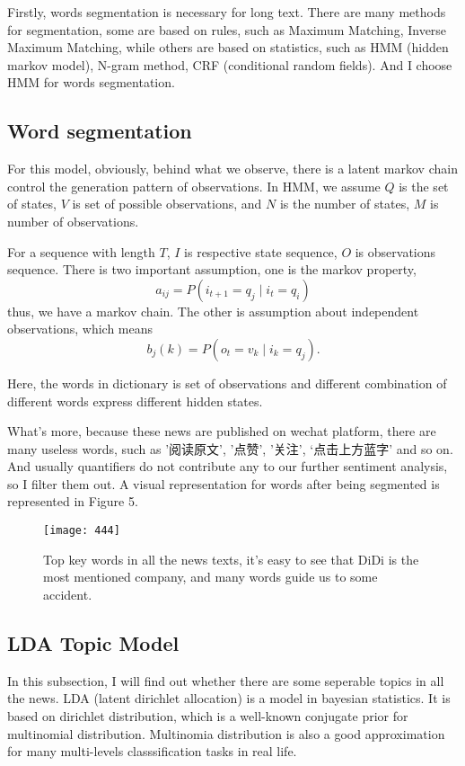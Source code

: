 \documentclass[12pt]{extarticle}
\begin{document}
Firstly, words segmentation is necessary for long text. There are many methods for segmentation, some are based on rules, such as Maximum Matching, Inverse Maximum Matching, while others are based on statistics, such as HMM (hidden markov model), N-gram method, CRF (conditional random fields). And I choose HMM for words segmentation.
\subsection{Word segmentation}
For this model, obviously, behind what we observe, there is a latent markov chain control the generation pattern of observations. In HMM, we assume $Q$ is the set of states, $V$ is set of possible observations, and $N$ is the number of states, $M$ is number of observations.

For a sequence with length $T$, $I$ is respective state sequence, $O$ is observations sequence. There is two important assumption, one is the markov property,
$$a_{ij} = P(i_{t+1} = q_j \mid i_t = q _i)$$
thus, we have a markov chain. The other is assumption about independent observations, which means 
$$b_j(k) = P(o_t = v_k \mid i_k = q_j).$$

Here, the words in dictionary is set of observations and different combination of different words express different hidden states.

What's more, because these news are published on wechat platform, there are many useless words, such as '阅读原文', '点赞', '关注', ‘点击上方蓝字' and so on. And usually quantifiers do not contribute any to our further sentiment analysis, so I filter them out. A visual representation for words after being segmented is represented in Figure 5.
\begin{figure}
	\centering
	\texttt{[image: 444]}
	\caption{Top key words in all the news texts, it's easy to see that DiDi is the most mentioned company, and many words guide us to some accident.}
	\label{fig:444}
\end{figure}

\subsection{LDA Topic Model}
In this subsection, I will find out whether there are some seperable topics in all the news. LDA (latent dirichlet allocation) is a model in bayesian statistics. It is based on dirichlet distribution, which is a well-known conjugate prior for multinomial distribution. Multinomia distribution is also a good approximation for many multi-levels classsification tasks in real life.
\end{document}
